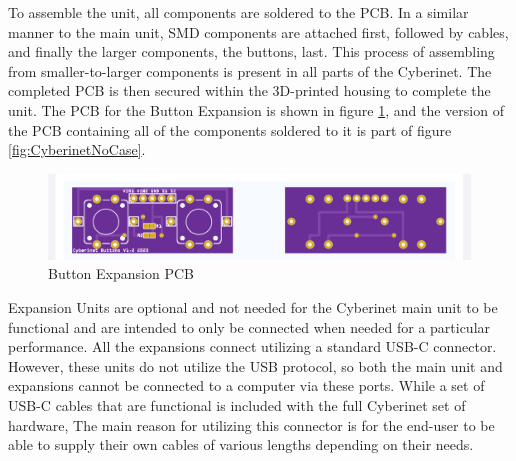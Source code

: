 To assemble the unit, all components are soldered to the PCB. In a similar manner to the main unit, SMD components are attached first, followed by cables, and finally the larger components, the buttons, last. This process of assembling from smaller-to-larger components is present in all parts of the Cyberinet.  The completed PCB is then secured within the 3D-printed housing to complete the unit. The PCB for the Button Expansion is shown in figure \ref{fig:buttonPCB}, and the version of the PCB containing all of the components soldered to it is part of figure \ref{fig:CyberinetNoCase}.


\begin{center}
    \begin{figure}
        \centering
        \includegraphics[scale=0.5]{diagrams/PCBs/buttons1.2.png}
        \caption{Button Expansion PCB}
        \label{fig:buttonPCB}
    \end{figure}
\end{center}


Expansion Units are optional and not needed for the Cyberinet main unit to be functional and are intended to only be connected when needed for a particular performance. All the expansions connect utilizing a standard USB-C connector. However, these units do not utilize the USB protocol, so both the main unit and expansions cannot be connected to a computer via these ports. While a set of USB-C cables that are functional is included with the full Cyberinet set of hardware, The main reason for utilizing this connector is for the end-user to be able to supply their own cables of various lengths depending on their needs. 


